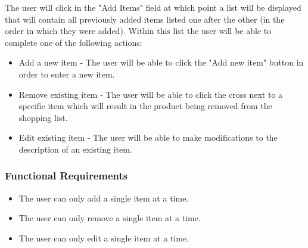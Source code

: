 \documentclass[10pt, a4paper, onecolumn]{scrartcl}
\begin{document}
				The user will click in the "Add Items" field at which point a list will be displayed that will contain all previously added items listed one after the other (in the order in which they were added). Within this list the user will be able to complete one of the following actions:
				
				\begin{itemize}
					\item Add a new item - The user will be able to click the "Add new item" button in order to enter a new item. 
					\item Remove existing item - The user will be able to click the cross next to a specific item which will result in the product being removed from the shopping list.
					\item Edit existing item - The user will be able to make modifications to the description of an existing item.
				\end{itemize}
			
			\subsubsection*{Functional Requirements}
			
				\begin{itemize}
					\item The user can only add a single item at a time.
					\item The user can only remove a single item at a time.
					\item The user can only edit a single item at a time.
				\end{itemize}
			
%			
%			
%				
%			
		
\end{document}
